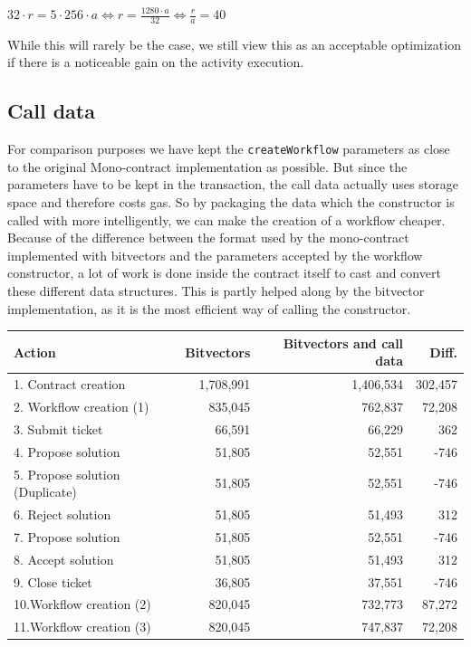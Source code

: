 \documentclass{article}
\begin{document}
		\begin{center}		
			$32 \cdot r = 5 \cdot 256 \cdot a \iff r = \frac{1280 \cdot a}{32} \iff \frac{r}{a} = 40$
		\end{center}
		
		While this will rarely be the case, we still view this as an acceptable optimization if there is a noticeable gain on the activity execution.

		\subsection{Call data}

		For comparison purposes we have kept the \texttt{createWorkflow} parameters as close to the original Mono-contract implementation as possible. 
		But since the parameters have to be kept in the transaction, the call data actually uses storage space and therefore costs gas.
		So by packaging the data which the constructor is called with more intelligently, we can make the creation of a workflow cheaper. 
		Because of the difference between the format used by the mono-contract implemented with bitvectors and the parameters accepted by the workflow constructor, a lot of work is done inside the contract itself to cast and convert these different data structures.
		This is partly helped along by the bitvector implementation, as it is the most efficient way of calling the constructor.

		\begin{table}[!ht]
		\label{tbl:bit-call-data-comparison}
			\begin{tabular}{| p{4cm} | r | r | r |}
			\hline
			Action 								& Bitvectors 	& Bitvectors and call data 	& Diff. 	\\ \hline
			1. Contract creation				& 1,708,991		& 1,406,534					& 302,457	\\ \hline
			2. Workflow creation (1)			& 835,045		& 762,837					& 72,208	\\ \hline		
			3. Submit ticket					& 66,591		& 66,229					& 362		\\ \hline
			4. Propose solution					& 51,805		& 52,551					& -746		\\ \hline
			5. Propose solution (Duplicate)		& 51,805		& 52,551					& -746		\\ \hline
			6. Reject solution					& 51,805		& 51,493					& 312		\\ \hline
			7. Propose solution					& 51,805		& 52,551					& -746		\\ \hline
			8. Accept solution					& 51,805		& 51,493					& 312		\\ \hline
			9. Close ticket						& 36,805		& 37,551					& -746		\\ \hline
			10.Workflow creation (2)			& 820,045		& 732,773					& 87,272	\\ \hline
			11.Workflow creation (3)			& 820,045		& 747,837					& 72,208	\\ \hline
			\end{tabular}
		\end{table}
		\FloatBarrier
\end{document}

